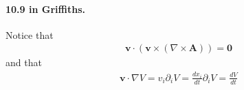 \paragraph{10.9 in Griffiths.} Notice that \begin{align*}
    \mathbf{v} \cdot \left( \mathbf{v} \times (\nabla \times \mathbf{A}) \right) = \mathbf{0}
\end{align*}
and that \begin{align*}
    \mathbf{v} \cdot \nabla V = v_{i} \partial _i V = \frac{dx_i}{dt} \partial _i V = \frac{dV}{dt}
\end{align*}

